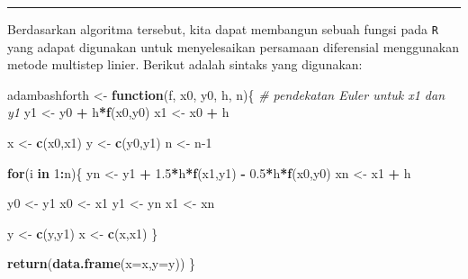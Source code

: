 \documentclass[
]{book}
\newenvironment{Shaded}{\begin{snugshade}}{\end{snugshade}}
\newcommand{\AttributeTok}[1]{\textcolor[rgb]{0.13,0.29,0.53}{#1}}
\newcommand{\CommentTok}[1]{\textcolor[rgb]{0.56,0.35,0.01}{\textit{#1}}}
\newcommand{\ControlFlowTok}[1]{\textcolor[rgb]{0.13,0.29,0.53}{\textbf{#1}}}
\newcommand{\DecValTok}[1]{\textcolor[rgb]{0.00,0.00,0.81}{#1}}
\newcommand{\FloatTok}[1]{\textcolor[rgb]{0.00,0.00,0.81}{#1}}
\newcommand{\FunctionTok}[1]{\textcolor[rgb]{0.13,0.29,0.53}{\textbf{#1}}}
\newcommand{\NormalTok}[1]{#1}
\newcommand{\OtherTok}[1]{\textcolor[rgb]{0.56,0.35,0.01}{#1}}
\newcommand{\SpecialCharTok}[1]{\textcolor[rgb]{0.81,0.36,0.00}{\textbf{#1}}}
\theoremstyle{definition}
\theoremstyle{definition}
\theoremstyle{definition}
\theoremstyle{definition}
\theoremstyle{remark}
\begin{document}
\begin{center}\rule{0.5\linewidth}{0.5pt}\end{center}

Berdasarkan algoritma tersebut, kita dapat membangun sebuah fungsi pada \texttt{R} yang adapat digunakan untuk menyelesaikan persamaan diferensial menggunakan metode multistep linier. Berikut adalah sintaks yang digunakan:

\begin{Shaded}
\begin{Highlighting}[]
\NormalTok{adambashforth }\OtherTok{\textless{}{-}} \ControlFlowTok{function}\NormalTok{(f, x0, y0, h, n)\{}
  \CommentTok{\# pendekatan Euler untuk x1 dan y1}
\NormalTok{  y1 }\OtherTok{\textless{}{-}}\NormalTok{ y0 }\SpecialCharTok{+}\NormalTok{ h}\SpecialCharTok{*}\FunctionTok{f}\NormalTok{(x0,y0)}
\NormalTok{  x1 }\OtherTok{\textless{}{-}}\NormalTok{ x0 }\SpecialCharTok{+}\NormalTok{ h}
  
\NormalTok{  x }\OtherTok{\textless{}{-}} \FunctionTok{c}\NormalTok{(x0,x1)}
\NormalTok{  y }\OtherTok{\textless{}{-}} \FunctionTok{c}\NormalTok{(y0,y1)}
\NormalTok{  n }\OtherTok{\textless{}{-}}\NormalTok{ n}\DecValTok{{-}1}
  
  \ControlFlowTok{for}\NormalTok{(i }\ControlFlowTok{in} \DecValTok{1}\SpecialCharTok{:}\NormalTok{n)\{}
\NormalTok{    yn }\OtherTok{\textless{}{-}}\NormalTok{ y1 }\SpecialCharTok{+} \FloatTok{1.5}\SpecialCharTok{*}\NormalTok{h}\SpecialCharTok{*}\FunctionTok{f}\NormalTok{(x1,y1) }\SpecialCharTok{{-}} \FloatTok{0.5}\SpecialCharTok{*}\NormalTok{h}\SpecialCharTok{*}\FunctionTok{f}\NormalTok{(x0,y0)}
\NormalTok{    xn }\OtherTok{\textless{}{-}}\NormalTok{ x1 }\SpecialCharTok{+}\NormalTok{ h}
    
\NormalTok{    y0 }\OtherTok{\textless{}{-}}\NormalTok{ y1}
\NormalTok{    x0 }\OtherTok{\textless{}{-}}\NormalTok{ x1}
\NormalTok{    y1 }\OtherTok{\textless{}{-}}\NormalTok{ yn}
\NormalTok{    x1 }\OtherTok{\textless{}{-}}\NormalTok{ xn}
    
\NormalTok{    y }\OtherTok{\textless{}{-}} \FunctionTok{c}\NormalTok{(y,y1)}
\NormalTok{    x }\OtherTok{\textless{}{-}} \FunctionTok{c}\NormalTok{(x,x1)}
\NormalTok{  \}}
  
  \FunctionTok{return}\NormalTok{(}\FunctionTok{data.frame}\NormalTok{(}\AttributeTok{x=}\NormalTok{x,}\AttributeTok{y=}\NormalTok{y))}
\NormalTok{\}}
\end{Highlighting}
\end{Shaded}
\end{document}
